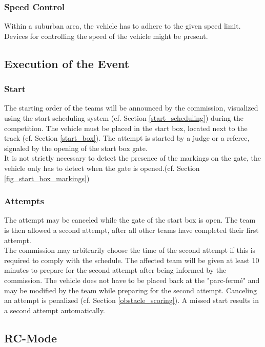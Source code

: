 \subsubsection{Speed Control}

Within a suburban area, the vehicle has to adhere to the given speed limit.
Devices for controlling the speed of the vehicle might be present.

\subsection{Execution of the Event}

\subsubsection{Start}

The starting order of the teams will be announced by the commission, visualized
using the start scheduling system (cf. Section \ref{start_scheduling}) during
the competition. The vehicle must be placed in the start box, located next to
the track (cf. Section \ref{start_box}). The attempt is started by a judge or a
referee, signaled by the opening of the start box gate.\\ It is not strictly
necessary to detect the presence of the markings on the gate, the vehicle only
has to detect when the gate is opened.(cf. Section
\ref{fig_start_box_markings})

\subsubsection{Attempts}

The attempt may be canceled while the gate of the start box is open. The team
is then allowed a second attempt, after all other teams have completed their
first attempt.\\ The commission may arbitrarily choose the time of the second
attempt if this is required to comply with the schedule. The affected team will
be given at least 10 minutes to prepare for the second attempt after being
informed by the commission. The vehicle does not have to be placed back at the
"parc-fermé" and may be modified by the team while preparing for the second
attempt. Canceling an attempt is penalized (cf. Section
\ref{obstacle_scoring}). A missed start results in a second attempt
automatically.

\subsection{RC-Mode}

